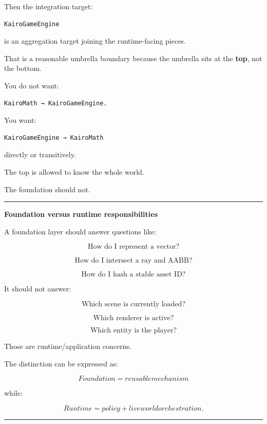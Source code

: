 Then the integration target:

\begin{verbatim}
KairoGameEngine
\end{verbatim}

is an  aggregation target joining the runtime-facing pieces.

That is a reasonable umbrella boundary because the umbrella sits at the \textbf{top}, not the bottom.

You do not want:

\begin{verbatim}
KairoMath → KairoGameEngine.
\end{verbatim}

You want:

\begin{verbatim}
KairoGameEngine → KairoMath
\end{verbatim}

directly or transitively.

The top is allowed to know the whole world.

The foundation should not.

\begin{center}\rule{0.5\linewidth}{0.5pt}\end{center}

\textbf{Foundation versus runtime responsibilities}

A foundation layer should answer questions like:

\[
\text{How do I represent a vector?}
\]

\[
\text{How do I intersect a ray and AABB?}
\]

\[
\text{How do I hash a stable asset ID?}
\]

It should not answer:

\[
\text{Which scene is currently loaded?}
\]

\[
\text{Which renderer is active?}
\]

\[
\text{Which entity is the player?}
\]

Those are runtime/application concerns.

The distinction can be expressed as:

\[
\boxed{
Foundation = reusable mechanism
}
\]

while:

\[
\boxed{
Runtime = policy + live world orchestration.
}
\]

\begin{center}\rule{0.5\linewidth}{0.5pt}\end{center}

